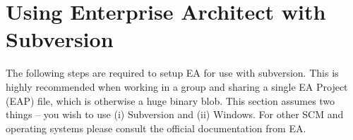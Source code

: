 \newpage

\section{Using Enterprise Architect with Subversion}
\visHeader

The following steps are required to setup EA for use with subversion. This is highly recommended when working in a group and sharing a single EA Project (EAP)
file, which is otherwise a huge binary blob. This section assumes two things -- you wish to use (i) Subversion and (ii) Windows. For other SCM
and operating systems please consult the official documentation from EA.








